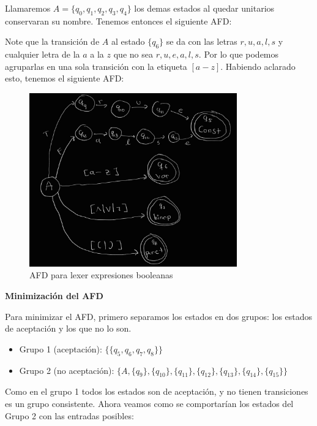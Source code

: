Llamaremos $A=\{q_0, q_1, q_2, q_3, q_4\}$ los demas estados al quedar unitarios conservaran su nombre. Tenemos entonces el siguiente AFD:


Note que la transición de $A$ al estado $\{q_6\}$ se da con las letras $r, u, a, l, s$ y cualquier letra de la $a$ a la $z$ que no sea $r, u, e, a, l, s$. Por lo que podemos agruparlas en una sola transición con la etiqueta $[a-z]$. Habiendo aclarado esto, tenemos el siguiente AFD:


\begin{figure}[h!]
    \centering
    \includegraphics[width=0.8\textwidth]{images/ejercicio10-2.jpg}
    \caption{AFD para lexer expresiones booleanas}
    \label{fig:my_label}
\end{figure}


\textbf{Minimización del AFD}

Para minimizar el AFD, primero separamos los estados en dos grupos: los estados de aceptación y los que no lo son.

\begin{itemize}
    \item Grupo 1 (aceptación): $\{\{q_5, q_6, q_7, q_8\}\}$
    \item Grupo 2 (no aceptación): $\{A, \{q_9\}, \{q_{10}\}, \{q_{11}\}, \{q_{12}\}, \{q_{13}\}, \{q_{14}\}, \{q_{15}\}\}$
\end{itemize}

Como en el grupo 1 todos los estados son de aceptación, y no tienen transiciones es un grupo consistente. Ahora veamos como se comportarían los estados del Grupo 2 con las entradas posibles: 

